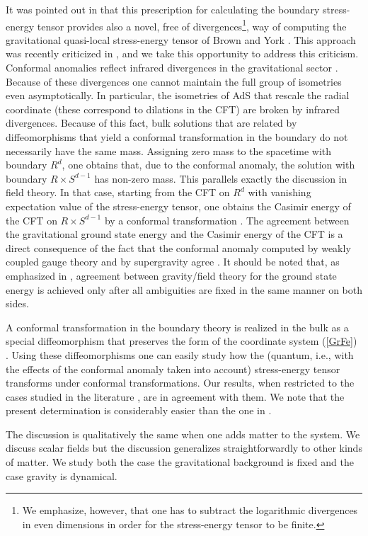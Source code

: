 It was pointed out in \cite{BK} that this prescription for 
calculating the boundary stress-energy tensor  
provides also a novel, free of divergences\footnote{
We emphasize, however, that one 
has to subtract the logarithmic divergences in even dimensions
in order for the stress-energy tensor to be finite.},
way of computing the gravitational quasi-local 
stress-energy tensor of Brown and York \cite{BrownYork}.
This approach was recently criticized in \cite{AshDas},
and we take this opportunity to address this criticism.
Conformal anomalies reflect infrared divergences 
in the gravitational sector \cite{HS}. 
Because of these divergences
one cannot maintain the full group of isometries even asymptotically.
In particular, the isometries of AdS that rescale the radial 
coordinate (these correspond to dilations in the CFT) 
are broken by infrared divergences. 
Because of this fact, 
bulk solutions that are related by diffeomorphisms that
yield a conformal transformation in the boundary do not 
necessarily have the same mass. Assigning zero mass 
to the spacetime with boundary $R^d$,
one obtains that, due to the conformal anomaly,
the solution with boundary $R \times S^{d-1}$ has 
non-zero mass. This parallels exactly the discussion 
in field theory. In that case, starting from the 
CFT on $R^d$ with vanishing expectation value
of the stress-energy tensor, one obtains 
the Casimir energy of the CFT on $R \times S^{d-1}$
by a conformal transformation \cite{CC}. The
agreement between the gravitational ground state energy 
and the Casimir energy of the CFT is a direct consequence
of the fact that the conformal anomaly 
computed by weakly coupled gauge theory and by 
supergravity agree \cite{HS}. It should be noted that, 
as emphasized in \cite{BK}, agreement between gravity/field
theory for the ground state energy is achieved only after
all ambiguities are fixed in the same manner on both
sides.
 
A conformal transformation in the boundary theory is realized in the bulk as a 
special diffeomorphism that preserves the form
of the coordinate system (\ref{GrFe}) \cite{ISTY}.
Using these diffeomorphisms one can easily study 
how the (quantum, i.e., with the effects of the 
conformal anomaly taken into account) stress-energy 
tensor transforms under conformal transformations.
Our results, when restricted to the
cases studied in the literature \cite{CC},
are in agreement with them. We note that the present 
determination is considerably easier than the one in \cite{CC}.

The discussion is qualitatively the same when one 
adds matter to the system. We discuss 
scalar fields but the discussion generalizes straightforwardly
to other kinds of matter. We study both the case the 
gravitational background is fixed and the case
gravity is dynamical. 

